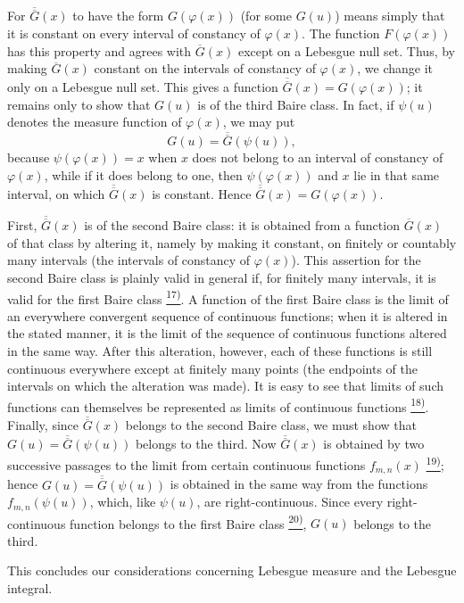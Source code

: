 \documentclass[12pt,b5paper,twoside]{article}
\newcommand{\noteref}[1]{%
  \hyperlink{note:#1}{\textsuperscript{#1)}}}
\begin{document}
For $\overline{\overline G}(x)$ to have the form $G(\varphi(x))$ (for some $G(u)$) means simply that it is constant on every interval of constancy of $\varphi(x)$. The function $F(\varphi(x))$ has this property and agrees with $\overline G(x)$ except on a Lebesgue null set. Thus, by making $\overline G(x)$ constant on the intervals of constancy of $\varphi(x)$, we change it only on a Lebesgue null set. This gives a function $\overline{\overline G}(x)=G(\varphi(x))$; it remains only to show that $G(u)$ is of the third Baire class. In fact, if $\psi(u)$ denotes the measure function of $\varphi(x)$, we may put
\[
 G(u)=\overline{\overline G}(\psi(u)),
\]
because $\psi(\varphi(x))=x$ when $x$ does not belong to an interval of constancy of $\varphi(x)$, while if it does belong to one, then $\psi(\varphi(x))$ and $x$ lie in that same interval, on which $\overline{\overline G}(x)$ is constant. Hence $\overline{\overline G}(x)=G(\varphi(x))$.

First, $\overline{\overline G}(x)$ is of the second Baire class: it is obtained from a function $\overline G(x)$ of that class by altering it, namely by making it constant, on finitely or countably many intervals (the intervals of constancy of $\varphi(x)$). This assertion for the second Baire class is plainly valid in general if, for finitely many intervals, it is valid for the first Baire class\noteref{17}. A function of the first Baire class is the limit of an everywhere convergent sequence of continuous functions; when it is altered in the stated manner, it is the limit of the sequence of continuous functions altered in the same way. After this alteration, however, each of these functions is still continuous everywhere except at finitely many points (the endpoints of the intervals on which the alteration was made). It is easy to see that limits of such functions can themselves be represented as limits of continuous functions\noteref{18}. Finally, since $\overline{\overline G}(x)$ belongs to the second Baire class, we must show that $G(u)=\overline{\overline G}(\psi(u))$ belongs to the third. Now $\overline{\overline G}(x)$ is obtained by two successive passages to the limit from certain continuous functions $f_{m,n}(x)$\noteref{19}; hence $G(u)=\overline{\overline G}(\psi(u))$ is obtained in the same way from the functions $f_{m,n}(\psi(u))$, which, like $\psi(u)$, are right-continuous. Since every right-continuous function belongs to the first Baire class\noteref{20}, $G(u)$ belongs to the third.

This concludes our considerations concerning Lebesgue measure and the Lebesgue integral.
\end{document}
